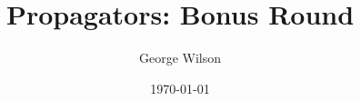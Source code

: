 \documentclass[usenames,dvipsnames,svgnames,table,aspectratio=1610,mathserif]{beamer}
\title[Propagators]{Propagators: Bonus Round} %
\author{George Wilson} %
\institute[] %
{
Data61/CSIRO\\ %
\medskip
\href{george.wilson@data61.csiro.au}{george.wilson@data61.csiro.au} %
}
\date{\today} %
\begin{document}


\begin{frame}
\titlepage %
\end{frame}
\end{document}
